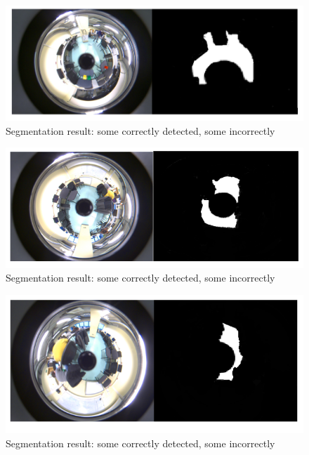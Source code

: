 \documentclass[11pt, a4paper, openany]{book}
\begin{document}
 \begin{figure}[H]
    \centering
    \includegraphics[scale=0.6]{Labbot&ele/conclusion2.png}
    \caption{Segmentation result: some correctly detected, some incorrectly }
    \label{fig:print} 
\end{figure}

 \begin{figure}[H]
    \centering
    \includegraphics[scale=0.9]{Labbot&ele/w3.png}
    \caption{Segmentation result: some correctly detected, some incorrectly }
    \label{fig:print} 
\end{figure}

 \begin{figure}[H]
    \centering
    \includegraphics[scale=0.9]{Labbot&ele/w4.png}
    \caption{Segmentation result: some correctly detected, some incorrectly }
    \label{fig:print} 
\end{figure}
\end{document}
